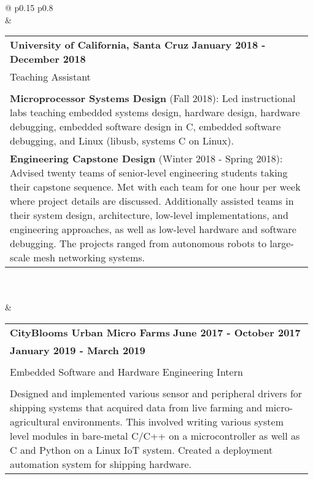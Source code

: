 \documentclass[letterpaper,11pt,oneside,a4paper]{article}
\def \tablefillwidth {0.98\linewidth}
\begin{document}
\begin{longtable}{@{\extracolsep{\fill}} p{0.15\textwidth} p{0.8\textwidth}}
\\ &
\begin{tabular}[t]{@{\extracolsep{\fill}} p{\tablefillwidth}}
{\large{\textbf{University of California, Santa Cruz}}} \hspace*{\fill} \textbf{January 2018 - December 2018}
\\
Teaching Assistant\\\\
\textbf{Microprocessor Systems Design} (Fall 2018):
Led instructional labs teaching embedded systems design, hardware design, hardware debugging, embedded software design in C, embedded software debugging, and Linux (libusb, systems C on Linux).\\

\textbf{Engineering Capstone Design} (Winter 2018 - Spring 2018):
Advised twenty teams of senior-level engineering students taking their capstone sequence. Met with each team for one hour per week where project details are discussed. Additionally assisted teams in their system design, architecture, low-level implementations, and engineering approaches, as well as low-level hardware and software debugging. The projects ranged from autonomous robots to large-scale mesh networking systems.\\

\end{tabular} \\

\\ &
\begin{tabular}[t]{@{\extracolsep{\fill}} p{\tablefillwidth}}
{\large{\textbf{CityBlooms Urban Micro Farms}}} \hspace*{\fill} \textbf{June 2017 - October 2017} \\
{\large{\textbf{                            }}} \hspace*{\fill} \textbf{January 2019 - March 2019} \\

\\
Embedded Software and Hardware Engineering Intern \\\\

Designed and implemented various sensor and peripheral drivers for shipping systems that acquired data from live farming and micro-agricultural environments. This involved writing various system level modules in bare-metal C/C++ on a microcontroller as well as C and Python on a Linux IoT system. Created a deployment automation system for shipping hardware.
\end{tabular} \\


\end{longtable}
\end{document}
